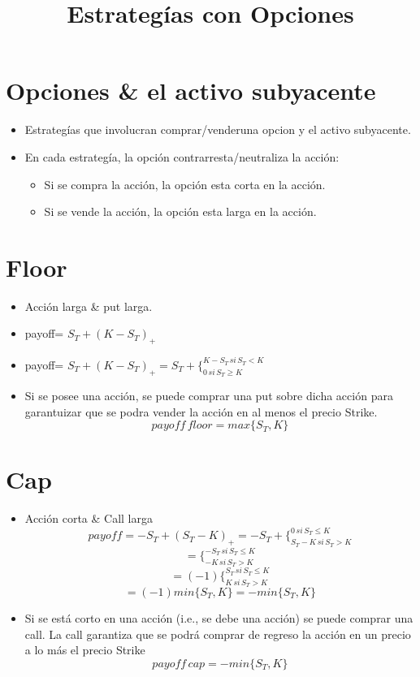 \documentclass[12pts]{extarticle}
\author{}
\date{}
\title{Estrategías con Opciones}
\begin{document}
\maketitle 
 \section{Opciones \& el activo subyacente} 

\begin{itemize} 
\item Estrategías que involucran comprar/venderuna opcion y el activo subyacente.
\item En cada estrategía, la opción contrarresta/neutraliza la acción:
\begin{itemize}
\item Si se compra la acción, la opción esta corta en la acción. 
\item Si se vende la acción, la opción esta larga en la acción. 
\end{itemize}
\end{itemize}

\section{Floor} 
\begin{itemize} 
\item Acción larga \& put larga.
\item payoff= $S_T + (K-S_T)_+$
\item payoff= $S_T+(K-S_T)_+ = S_T + \Bigg \{_{0 \, si \, S_T \geq K}^{K-S_T \, si \, S_T < K }$
\item Si se posee una acción, se puede comprar una put sobre dicha acción para garantuizar que se podra vender la acción en al menos el precio Strike. $$ payoff \, floor = max\{S_T, K\}$$ 
\end{itemize}

\section{Cap} 
\begin{itemize} 
\item Acción corta \& Call larga
$$ payoff= -S_T+(S_T-K)_+ =-S_T + \Bigg \{_{S_T-K \, si \, S_T >K}^{0 \, si \, S_T \leq K} $$
$$=\Bigg \{_{-K  \, si \, S_T > K}^{-S_T \, si \, S_T \leq K}$$ 
$$= (-1) \Bigg \{_{K  \, si\, S_T > K}^{S_T \, si \, S_T \leq K }$$ 
$$= (-1) min\{S_T,K\} =-min\{S_T,K\}$$
\item Si se está corto en una acción (i.e., se debe una acción) se puede comprar una call. La call garantiza que se podrá comprar de regreso la acción en un precio a lo más el precio Strike
$$payoff \, cap= -min\{S_T,K\}$$
\end{itemize}
\end{document}
